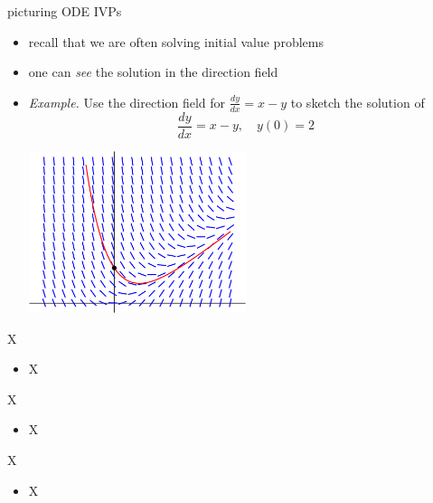 \documentclass{beamer}
\begin{document}
\begin{frame}{picturing ODE IVPs}

\begin{itemize}
\item recall that we are often solving initial value problems
\item one can \emph{see} the solution in the direction field

\bigskip
\item \begin{minipage}[t]{0.37\textwidth}
\emph{Example.}  Use the direction field for
$\frac{dy}{dx} = x-y$ to sketch the solution of
    $$\frac{dy}{dx} = x-y, \quad y(0)=2$$
\end{minipage}

\vspace{-25mm}
\hfill \includegraphics[width=0.5\textwidth]{figs/example-field-solution}
\end{itemize}
\end{frame}


\begin{frame}{X}

\begin{itemize}
\item X
\end{itemize}
\end{frame}


\begin{frame}{X}

\begin{itemize}
\item X
\end{itemize}
\end{frame}


\begin{frame}{X}

\begin{itemize}
\item X
\end{itemize}
\end{frame}
\end{document}
